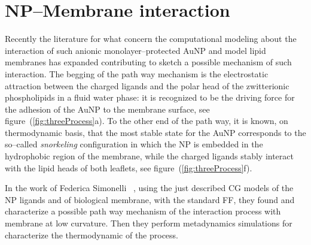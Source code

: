 \section{NP--Membrane interaction}
Recently the literature for what concern the computational modeling about the interaction of such anionic monolayer--protected \ac{AuNP} and model lipid membranes has expanded contributing to sketch a possible mechanism of such interaction. The begging of the path way mechanism is the electrostatic attraction between the charged ligands and the polar head of the zwitterionic phospholipids in a fluid water phase: it is recognized to be the driving force for the adhesion of the \ac{AuNP} to the membrane surface, see figure~(\ref{fig:threeProcess}a). To the other end of the path way, it is known, on thermodynamic basis, that the most stable state for the \ac{AuNP} corresponds to the so--called \textit{snorkeling} configuration in which the \ac{NP} is embedded in the hydrophobic region of the membrane, while the charged ligands stably interact with the lipid heads of both leaflets, see figure~(\ref{fig:threeProcess}f). 

In the work of Federica Simonelli \etal\, \cite{ourPaper}, using the just described \ac{CG} \martini models of the \ac{NP} ligands and of biological membrane, with the standard \martini \ac{FF}, they found and characterize a possible path way mechanism of the interaction process with membrane at low curvature. Then they perform metadynamics simulations for characterize the thermodynamic of the process.

